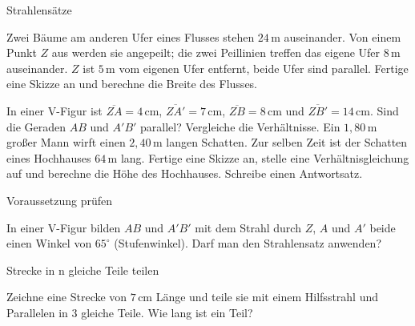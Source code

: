 \begin{aufgabe}{Strahlensätze}
\begin{teile}
\leerfeld[m]
\teil Zwei Bäume am anderen Ufer eines Flusses stehen $24\,\text{m}$ auseinander. Von einem Punkt $Z$ aus werden sie angepeilt; die zwei Peillinien treffen das eigene Ufer $8\,\text{m}$ auseinander. $Z$ ist $5\,\text{m}$ vom eigenen Ufer entfernt, beide Ufer sind parallel. Fertige eine Skizze an und berechne die Breite des Flusses.

\teil In einer V-Figur ist $\overline{ZA} = 4\,\text{cm}$, $\overline{ZA'} = 7\,\text{cm}$, $\overline{ZB} = 8\,\text{cm}$ und $\overline{ZB'} = 14\,\text{cm}$. Sind die Geraden $AB$ und $A'B'$ parallel? Vergleiche die Verhältnisse.
\teil Ein $1{,}80\,\text{m}$ großer Mann wirft einen $2{,}40\,\text{m}$ langen Schatten. Zur selben Zeit ist der Schatten eines Hochhauses $64\,\text{m}$ lang. Fertige eine Skizze an, stelle eine Verhältnisgleichung auf und berechne die Höhe des Hochhauses. Schreibe einen Antwortsatz.

\end{teile}
\end{aufgabe}

\begin{aufgabe}{Voraussetzung prüfen}
\begin{teile}
\teil In einer V-Figur bilden $AB$ und $A'B'$ mit dem Strahl durch $Z$, $A$ und $A'$ beide einen Winkel von $65^\circ$ (Stufenwinkel). Darf man den Strahlensatz anwenden?  \\ 
\end{teile}
\end{aufgabe}

\begin{aufgabe}{Strecke in n gleiche Teile teilen}
\begin{teile}
\teil Zeichne eine Strecke von $7\,\text{cm}$ Länge und teile sie mit einem Hilfsstrahl und Parallelen in $3$ gleiche Teile. Wie lang ist ein Teil?

\begin{ksys}[xmin=0,xmax=12,ymin=0,ymax=6]\end{ksys}
\end{teile}
\end{aufgabe}

